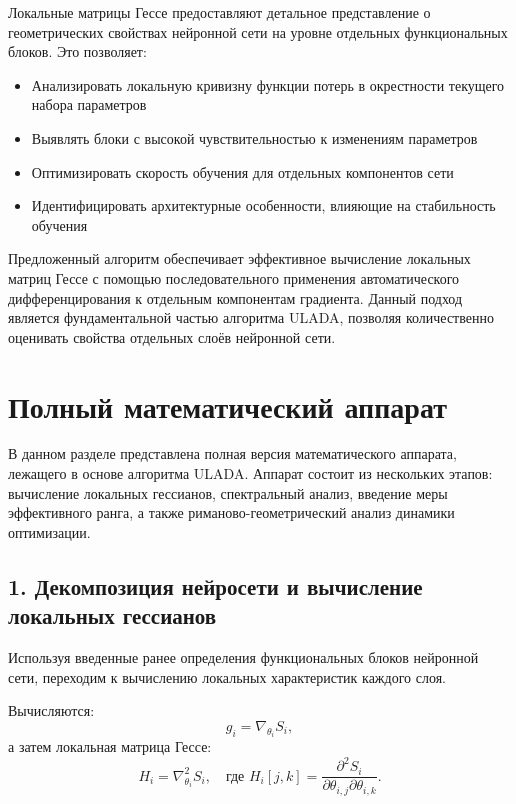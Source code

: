 \documentclass[a4paper,12pt]{article}
\begin{document}
Локальные матрицы Гессе предоставляют детальное представление о геометрических свойствах нейронной сети на уровне отдельных функциональных блоков. Это позволяет:

\begin{itemize}
\item Анализировать локальную кривизну функции потерь в окрестности текущего набора параметров
\item Выявлять блоки с высокой чувствительностью к изменениям параметров
\item Оптимизировать скорость обучения для отдельных компонентов сети
\item Идентифицировать архитектурные особенности, влияющие на стабильность обучения
\end{itemize}

Предложенный алгоритм обеспечивает эффективное вычисление локальных матриц Гессе с помощью последовательного применения автоматического дифференцирования к отдельным компонентам градиента. Данный подход является фундаментальной частью алгоритма ULADA, позволяя количественно оценивать свойства отдельных слоёв нейронной сети.

\bigskip

\section{Полный математический аппарат}

В данном разделе представлена полная версия математического аппарата, лежащего в основе алгоритма ULADA. Аппарат состоит из нескольких этапов: вычисление локальных гессианов, спектральный анализ, введение меры эффективного ранга, а также риманово-геометрический анализ динамики оптимизации.

\subsection*{1. Декомпозиция нейросети и вычисление локальных гессианов}

Используя введенные ранее определения функциональных блоков нейронной сети, переходим к вычислению локальных характеристик каждого слоя.

Вычисляются:
\begin{equation}
    g_i = \nabla_{\theta_i} S_i,
\end{equation}
а затем локальная матрица Гессе:
\begin{equation}
    H_i = \nabla^2_{\theta_i} S_i, \quad \text{где } H_i[j,k] = \frac{\partial^2 S_i}{\partial \theta_{i,j}\partial \theta_{i,k}}.
\end{equation}
\end{document}
